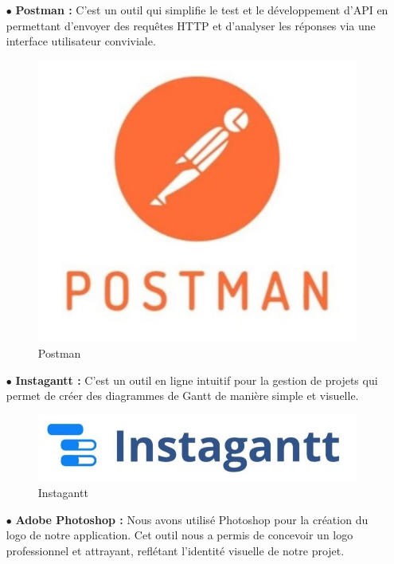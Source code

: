 \begin{itemize}
\begin{figure}[ht]
          \end{figure}
          \bigskip

    \item[$\bullet$] \textbf{ Postman :}
          C'est un outil qui simplifie le test et le développement d'API en permettant d'envoyer des requêtes HTTP et d'analyser les réponses via une interface utilisateur conviviale.

          \begin{figure}[H]
              \centering\includegraphics[scale=0.28]{chap1.images/Postman-Logo.jpg}
              \caption{Postman}

          \end{figure}
          \bigskip

    \item[$\bullet$] \textbf{ Instagantt  :}
          C'est un outil en ligne intuitif pour la gestion de projets qui permet de créer des diagrammes de Gantt de manière simple et visuelle.
          \bigskip
          \begin{figure}[H]
              \centering\includegraphics[scale=0.28]{chap1.images/instagantt_logo.jpg}
              \caption{Instagantt }

          \end{figure}
          \bigskip
    \item[$\bullet$] \textbf{ Adobe Photoshop :}
          Nous avons utilisé Photoshop pour la création du logo de notre application. Cet outil nous a permis de concevoir un logo professionnel et attrayant, reflétant l'identité visuelle de notre projet.


\end{itemize}
